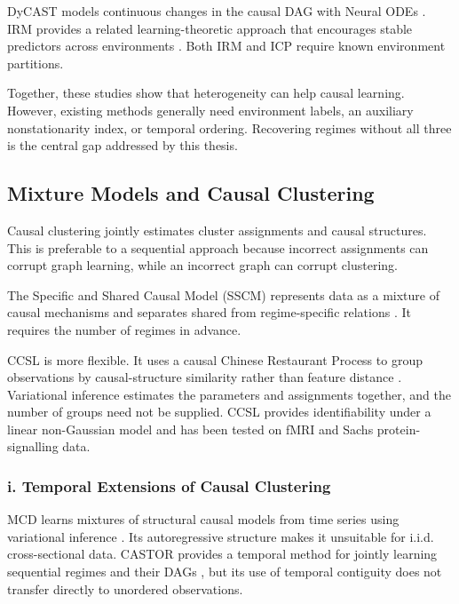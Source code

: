 DyCAST models continuous changes in the causal DAG with Neural ODEs
\cite{cheng2025dycast}. IRM provides a related learning-theoretic approach that
encourages stable predictors across environments \cite{arjovsky2019irm}. Both IRM
and ICP require known environment partitions.

Together, these studies show that heterogeneity can help causal learning. However,
existing methods generally need environment labels, an auxiliary nonstationarity
index, or temporal ordering. Recovering regimes without all three is the central gap
addressed by this thesis.

\subsection{Mixture Models and Causal Clustering}
\label{ssec:clustering}

Causal clustering jointly estimates cluster assignments and causal structures. This
is preferable to a sequential approach because incorrect assignments can corrupt
graph learning, while an incorrect graph can corrupt clustering.

The Specific and Shared Causal Model (SSCM) represents data as a mixture of causal
mechanisms and separates shared from regime-specific relations
\cite{huang2019specific}. It requires the number of regimes in advance.

CCSL is more flexible. It uses a causal Chinese Restaurant Process to group
observations by causal-structure similarity rather than feature distance
\cite{chen2023ccsl}. Variational inference estimates the parameters and assignments
together, and the number of groups need not be supplied. CCSL provides
identifiability under a linear non-Gaussian model and has been tested on fMRI and
Sachs protein-signalling data.

\subsubsection*{i. Temporal Extensions of Causal Clustering}

MCD learns mixtures of structural causal models from time series using variational
inference \cite{varambally2024mcd}. Its autoregressive structure makes it unsuitable
for i.i.d. cross-sectional data. CASTOR provides a temporal method for jointly
learning sequential regimes and their DAGs \cite{rahmani2025castor}, but its use of
temporal contiguity does not transfer directly to unordered observations.

